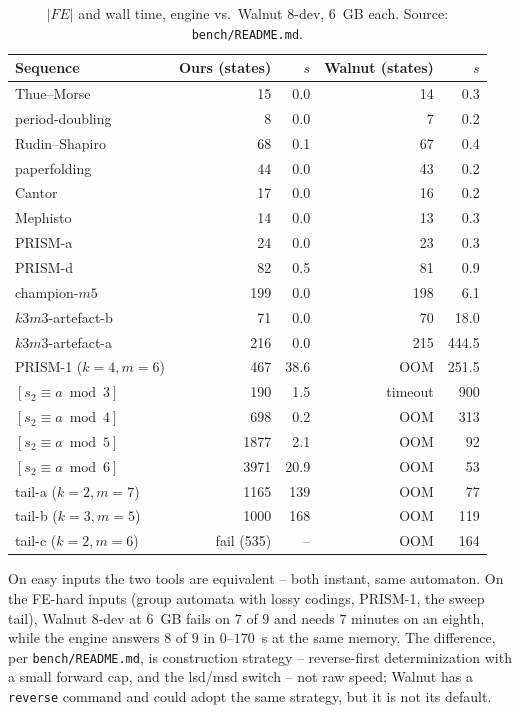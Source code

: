\documentclass[11pt]{article}
\begin{document}
\begin{table}[h]
\centering
\caption{$|FE|$ and wall time, engine vs.\ Walnut 8-dev, 6~GB each. Source:
\texttt{bench/README.md}.}
\label{tab:walnut}
\begin{tabular}{@{}lrrrr@{}}
\toprule
Sequence & Ours (states) & $s$ & Walnut (states) & $s$ \\
\midrule
Thue--Morse & 15 & 0.0 & 14 & 0.3 \\
period-doubling & 8 & 0.0 & 7 & 0.2 \\
Rudin--Shapiro & 68 & 0.1 & 67 & 0.4 \\
paperfolding & 44 & 0.0 & 43 & 0.2 \\
Cantor & 17 & 0.0 & 16 & 0.2 \\
Mephisto & 14 & 0.0 & 13 & 0.3 \\
PRISM-a & 24 & 0.0 & 23 & 0.3 \\
PRISM-d & 82 & 0.5 & 81 & 0.9 \\
champion-$m5$ & 199 & 0.0 & 198 & 6.1 \\
$k3m3$-artefact-b & 71 & 0.0 & 70 & 18.0 \\
$k3m3$-artefact-a & 216 & 0.0 & 215 & 444.5 \\
PRISM-1 ($k{=}4,m{=}6$) & 467 & 38.6 & OOM & 251.5 \\
$[s_2\equiv a\bmod3]$ & 190 & 1.5 & timeout & 900 \\
$[s_2\equiv a\bmod4]$ & 698 & 0.2 & OOM & 313 \\
$[s_2\equiv a\bmod5]$ & 1877 & 2.1 & OOM & 92 \\
$[s_2\equiv a\bmod6]$ & 3971 & 20.9 & OOM & 53 \\
tail-a ($k{=}2,m{=}7$) & 1165 & 139 & OOM & 77 \\
tail-b ($k{=}3,m{=}5$) & 1000 & 168 & OOM & 119 \\
tail-c ($k{=}2,m{=}6$) & fail (535) & -- & OOM & 164 \\
\bottomrule
\end{tabular}
\end{table}

On easy inputs the two tools are equivalent -- both instant, same automaton. On the
FE-hard inputs (group automata with lossy codings, PRISM-1, the sweep tail), Walnut
8-dev at $6$~GB fails on $7$ of $9$ and needs $7$ minutes on an eighth, while the engine
answers $8$ of $9$ in $0$--$170$~s at the same memory. The difference, per
\texttt{bench/README.md}, is construction strategy -- reverse-first determinization with
a small forward cap, and the lsd/msd switch -- not raw speed; Walnut has a
\texttt{reverse} command and could adopt the same strategy, but it is not its default.
\end{document}
